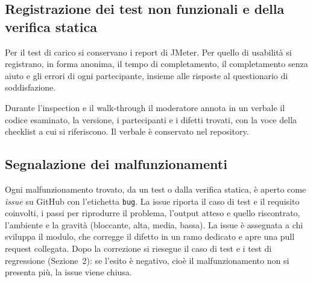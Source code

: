 \subsection{Registrazione dei test non funzionali e della verifica statica}

Per il test di carico si conservano i report di JMeter. Per quello di usabilità si registrano, in forma anonima, il tempo di completamento, il completamento senza aiuto e gli errori di ogni partecipante, insieme alle risposte al questionario di soddisfazione.

Durante l'inspection e il walk-through il moderatore annota in un verbale il codice esaminato, la versione, i partecipanti e i difetti trovati, con la voce della checklist a cui si riferiscono. Il verbale è conservato nel repository.

\subsection{Segnalazione dei malfunzionamenti}

Ogni malfunzionamento trovato, da un test o dalla verifica statica, è aperto come \emph{issue} su GitHub con l'etichetta \texttt{bug}.
La issue riporta il caso di test e il requisito coinvolti, i passi per riprodurre il problema, l'output atteso e quello riscontrato, l'ambiente e la gravità (bloccante, alta, media, bassa). La issue è assegnata a chi sviluppa il modulo, che corregge il difetto in un ramo dedicato e apre una pull request collegata. Dopo la correzione si riesegue il caso di test e i test di regressione (Sezione~2): se l'esito è negativo, cioè il malfunzionamento non si presenta più, la issue viene chiusa.
